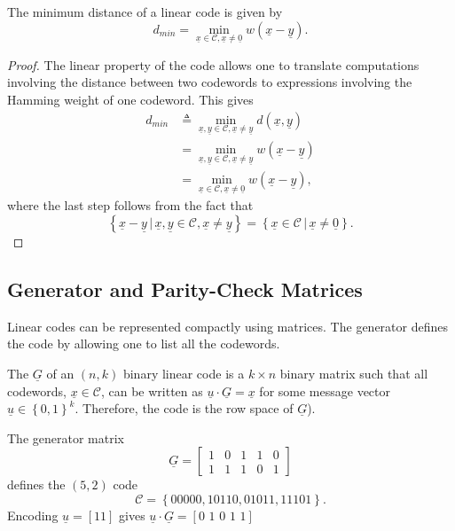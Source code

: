 \begin{proposition}
The minimum distance of a linear code is given by
\[ d_{min} =\min_{\underline{x}\in\mathcal{C},\underline{x}\neq\underline{0}}w(\underline{x}-\underline{y}). \]
\end{proposition}
\begin{proof}
The linear property of the code allows one to translate computations involving the distance between two codewords to expressions involving the Hamming weight of one codeword.
This gives
\begin{align*}
d_{min}
&\triangleq\min_{\underline{x},\underline{y}\in\mathcal{C},\underline{x}\neq\underline{y}}d(\underline{x},\underline{y}) \\
&=\min_{\underline{x},\underline{y}\in\mathcal{C},\underline{x}\neq\underline{y}}w(\underline{x}-\underline{y}) \\
&=\min_{\underline{x}\in\mathcal{C},\underline{x}\neq\underline{0}}w(\underline{x}-\underline{y}),
\end{align*}
where the last step follows from the fact that
\[ \left\{\underline{x}-\underline{y} \,|\, \underline{x},\underline{y}\in\mathcal{C},\underline{x}\neq \underline{y} \right\}
= \left\{\underline{x}\in\mathcal{C} \,|\, \underline{x}\neq \underline{0} \right\}. \]
\end{proof}

\subsection{Generator and Parity-Check Matrices}

Linear codes can be represented compactly using matrices.
The generator defines the code by allowing one to list all the codewords.

\begin{definition}
The  $\underline{G}$ of an $(n,k)$ binary linear code is a $k\times n$ binary matrix such that all codewords, $\underline{x}\in\mathcal{C}$, can be written as $\underline{u}\cdot\underline{G}=\underline{x}$ for some message vector $\underline{u}\in\left\{ 0,1\right\} ^{k}$.
Therefore, the code is the row space of $\underline{G}$).
\end{definition}

\begin{example}
The generator matrix
\[\underline{G}=\left[\begin{array}{ccccc}
1 & 0 & 1 & 1 & 0\\
1 & 1 & 1 & 0 & 1\end{array}\right] \]
defines the $(5,2)$ code
\[ \mathcal{C} = \left\{ 00000,10110,01011,11101\right\}. \]
Encoding $\underline{u}=[11]$ gives $\underline{u}\cdot\underline{G}=[0\,\,1\,\,0\,\,1\,\,1]$
\end{example}

